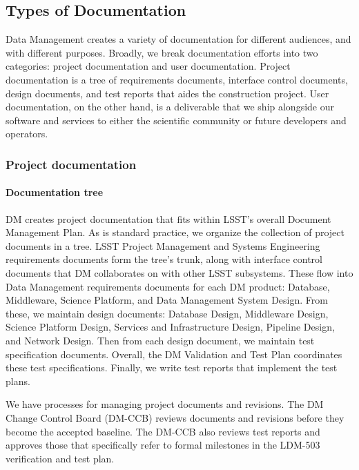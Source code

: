 \subsection{Types of Documentation}
\label{sec:doc_types}

Data Management creates a variety of documentation for different audiences, and with different purposes.
Broadly, we break documentation efforts into two categories: project documentation and user documentation.
Project documentation is a tree of requirements documents, interface control documents, design documents, and test reports that aides the construction project.
User documentation, on the other hand, is a deliverable that we ship alongside our software and services to either the scientific community or future developers and operators.

\subsubsection{Project documentation}
\label{sec:project_docs}

\paragraph{Documentation tree}

DM creates project documentation that fits within LSST's overall Document Management Plan.\cite{LPM-51}
As is standard practice, we organize the collection of project documents in a tree.
LSST Project Management and Systems Engineering requirements documents form the tree's trunk, along with interface control documents that DM collaborates on with other LSST subsystems.
These flow into Data Management requirements documents for each DM product: Database,\cite{LDM-555} Middleware,\cite{LDM-556} Science Platform,\cite{LDM-554} and Data Management System Design.\cite{LDM-148}
From these, we maintain design documents: Database Design,\cite{LDM-135} Middleware Design,\cite{LDM-152} Science Platform Design,\cite{LDM-542} Services and Infrastructure Design,\cite{LDM-129} Pipeline Design,\cite{LDM-151} and Network Design.\cite{LSE-78}
Then from each design document, we maintain test specification documents.
Overall, the DM Validation and Test Plan\cite{LDM-503} coordinates these test specifications.
Finally, we write test reports that implement the test plans.

We have processes for managing project documents and revisions.
The DM Change Control Board (DM-CCB) reviews documents and revisions before they become the accepted baseline.
The DM-CCB also reviews test reports and approves those that specifically refer to formal milestones in the LDM-503 verification and test plan.

